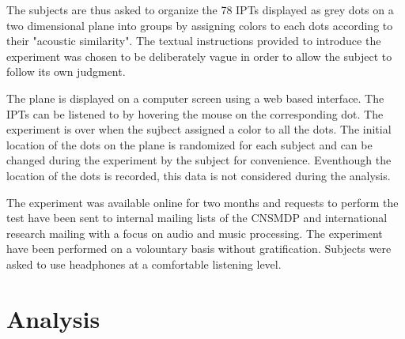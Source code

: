 \documentclass{article}
\newcommand{\ipts}{IPTs\xspace}
\begin{document}
The subjects are thus asked to organize the 78 \ipts displayed as grey dots on a two dimensional plane into groups by assigning colors to each dots according to their "acoustic similarity". The textual instructions provided to introduce the experiment was chosen to be deliberately vague in order to allow the subject to follow its own judgment.

The plane is displayed on a computer screen using a web based interface. The \ipts can be listened to by hovering the mouse on the corresponding dot. The experiment is over when the sujbect assigned a color to all the dots. The initial location of the dots on the plane is randomized for each subject and can be changed during the experiment by the subject for convenience. Eventhough the location of the dots is recorded, this data is not considered during the analysis.

The experiment was available online for two months and requests to perform the test have been sent to internal mailing lists of the CNSMDP and international research mailing with a focus on audio and music processing. The experiment have been performed on a volountary basis without gratification. Subjects were asked to use headphones at a comfortable listening level.

\section{Analysis}\label{sec:analysis}
\end{document}
